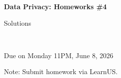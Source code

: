 \documentclass[12pt]{article}
\begin{document}
\begin{center}
{\bf Data Privacy: Homeworks \#4 \begin{solution}Solutions\end{solution}}\\ \medskip
\begin{problem}Due on Monday 11PM, June 8, 2026 \end{problem}
\end{center}

\begin{problem}
\noindent
Note: Submit homework via LearnUS. %
\end{problem}

\begin{solution}
\end{solution}
\end{document}
